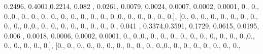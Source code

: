 \documentclass[
]{book}
\newenvironment{Shaded}{\begin{snugshade}}{\end{snugshade}}
\newcommand{\FloatTok}[1]{\textcolor[rgb]{0.00,0.00,0.81}{#1}}
\newcommand{\NormalTok}[1]{#1}
\begin{document}
\begin{Shaded}
\begin{Highlighting}[]
\FloatTok{0.2496}\NormalTok{, }\FloatTok{0.4001}\NormalTok{,}\FloatTok{0.2214}\NormalTok{, }\FloatTok{0.082}\NormalTok{ , }\FloatTok{0.0261}\NormalTok{, }\FloatTok{0.0079}\NormalTok{, }\FloatTok{0.0024}\NormalTok{, }\FloatTok{0.0007}\NormalTok{, }\FloatTok{0.0002}\NormalTok{, }\FloatTok{0.0001}\NormalTok{,}
\FloatTok{0.}\NormalTok{, }\FloatTok{0.}\NormalTok{, }\FloatTok{0.}\NormalTok{,}\FloatTok{0.}\NormalTok{, }\FloatTok{0.}\NormalTok{, }\FloatTok{0.}\NormalTok{, }\FloatTok{0.}\NormalTok{, }\FloatTok{0.}\NormalTok{, }\FloatTok{0.}\NormalTok{, }\FloatTok{0.}\NormalTok{, }\FloatTok{0.}\NormalTok{, }\FloatTok{0.}\NormalTok{, }\FloatTok{0.}\NormalTok{, }\FloatTok{0.}\NormalTok{,}\FloatTok{0.}\NormalTok{, }\FloatTok{0.}\NormalTok{, }\FloatTok{0.}\NormalTok{, }\FloatTok{0.}\NormalTok{, }\FloatTok{0.}\NormalTok{, }\FloatTok{0.}\NormalTok{],}
\NormalTok{[}\FloatTok{0.}\NormalTok{, }\FloatTok{0.}\NormalTok{, }\FloatTok{0.}\NormalTok{, }\FloatTok{0.}\NormalTok{, }\FloatTok{0.}\NormalTok{, }\FloatTok{0.}\NormalTok{, }\FloatTok{0.}\NormalTok{, }\FloatTok{0.}\NormalTok{, }\FloatTok{0.}\NormalTok{, }\FloatTok{0.}\NormalTok{, }\FloatTok{0.}\NormalTok{,}\FloatTok{0.}\NormalTok{, }\FloatTok{0.}\NormalTok{, }\FloatTok{0.}\NormalTok{, }\FloatTok{0.}\NormalTok{, }\FloatTok{0.}\NormalTok{, }\FloatTok{0.}\NormalTok{, }\FloatTok{0.}\NormalTok{, }\FloatTok{0.}\NormalTok{, }\FloatTok{0.}\NormalTok{,}
\FloatTok{0.041}\NormalTok{ , }\FloatTok{0.3374}\NormalTok{,}\FloatTok{0.3591}\NormalTok{, }\FloatTok{0.1729}\NormalTok{, }\FloatTok{0.0615}\NormalTok{, }\FloatTok{0.0195}\NormalTok{, }\FloatTok{0.006}\NormalTok{ , }\FloatTok{0.0018}\NormalTok{, }\FloatTok{0.0006}\NormalTok{, }\FloatTok{0.0002}\NormalTok{,}
\FloatTok{0.0001}\NormalTok{, }\FloatTok{0.}\NormalTok{, }\FloatTok{0.}\NormalTok{,}\FloatTok{0.}\NormalTok{, }\FloatTok{0.}\NormalTok{, }\FloatTok{0.}\NormalTok{, }\FloatTok{0.}\NormalTok{, }\FloatTok{0.}\NormalTok{, }\FloatTok{0.}\NormalTok{, }\FloatTok{0.}\NormalTok{, }\FloatTok{0.}\NormalTok{, }\FloatTok{0.}\NormalTok{, }\FloatTok{0.}\NormalTok{, }\FloatTok{0.}\NormalTok{,}\FloatTok{0.}\NormalTok{, }\FloatTok{0.}\NormalTok{, }\FloatTok{0.}\NormalTok{, }\FloatTok{0.}\NormalTok{, }\FloatTok{0.}\NormalTok{,}
\FloatTok{0.}\NormalTok{], [}\FloatTok{0.}\NormalTok{, }\FloatTok{0.}\NormalTok{, }\FloatTok{0.}\NormalTok{, }\FloatTok{0.}\NormalTok{, }\FloatTok{0.}\NormalTok{, }\FloatTok{0.}\NormalTok{, }\FloatTok{0.}\NormalTok{, }\FloatTok{0.}\NormalTok{, }\FloatTok{0.}\NormalTok{, }\FloatTok{0.}\NormalTok{, }\FloatTok{0.}\NormalTok{,}\FloatTok{0.}\NormalTok{, }\FloatTok{0.}\NormalTok{, }\FloatTok{0.}\NormalTok{, }\FloatTok{0.}\NormalTok{, }\FloatTok{0.}\NormalTok{, }\FloatTok{0.}\NormalTok{, }\FloatTok{0.}\NormalTok{, }\FloatTok{0.}\NormalTok{,}

\end{Highlighting}
\end{Shaded}
\end{document}
